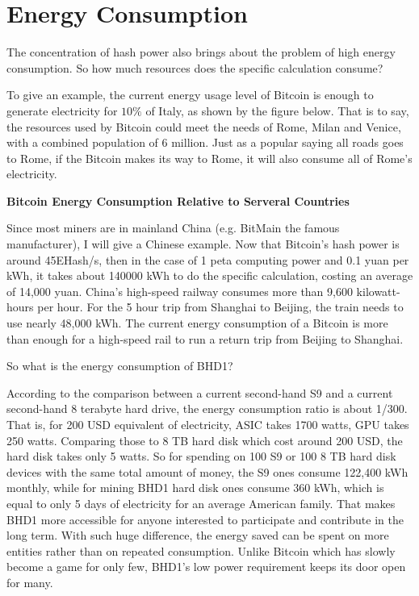 \section{Energy Consumption}
\begin{flushleft}
    The concentration of hash power also brings about the problem of high energy consumption. So how much resources does the specific calculation consume?
\end{flushleft}
\begin{flushleft}
    To give an example, the current energy usage level of Bitcoin is enough to generate electricity for $10\%$ of Italy, as shown by the figure below. That is to say, the resources used by Bitcoin could meet the needs of Rome, Milan and Venice, with a combined population of 6 million. Just as a popular saying all roads goes to Rome, if the Bitcoin makes its way to Rome, it will also consume all of Rome's electricity.
\end{flushleft}
\begin{flushleft}
    \centering\textbf{Bitcoin Energy Consumption Relative to Serveral Countries}
\end{flushleft}

\begin{flushleft}
    Since most miners are in mainland China (e.g. BitMain the famous manufacturer), I will give a Chinese example. Now that Bitcoin's hash power is around 45EHash/s, then in the case of 1 peta computing power and 0.1 yuan per kWh, it takes about 140000 kWh to do the specific calculation, costing an average of 14,000 yuan. China's high-speed railway consumes more than 9,600 kilowatt-hours per hour. For the 5 hour trip from Shanghai to Beijing, the train needs to use nearly 48,000 kWh. The current energy consumption of a Bitcoin is more than enough for a high-speed rail to run a return trip from Beijing to Shanghai.
\end{flushleft}
\begin{flushleft}
    So what is the energy consumption of BHD1?
\end{flushleft}
\begin{flushleft}
    According to the comparison between a current second-hand S9 and a current second-hand 8 terabyte hard drive, the energy consumption ratio is about 1/300. That is, for 200 USD equivalent of electricity, ASIC takes 1700 watts, GPU takes 250 watts. Comparing those to 8 TB hard disk which cost around 200 USD, the hard disk takes only 5 watts. So for spending on 100 S9 or 100 8 TB hard disk devices with the same total amount of money, the S9 ones consume 122,400 kWh monthly, while for mining BHD1 hard disk ones consume 360 kWh, which is equal to only 5 days of electricity for an average American family. That makes BHD1 more accessible for anyone interested to participate and contribute in the long term. With such huge difference, the energy saved can be spent on more entities rather than on repeated consumption. Unlike Bitcoin which has slowly become a game for only few, BHD1’s low power requirement keeps its door open for many.
\end{flushleft}
